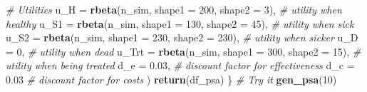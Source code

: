 \documentclass[
]{article}
\newenvironment{Shaded}{\begin{snugshade}}{\end{snugshade}}
\newcommand{\CommentTok}[1]{\textcolor[rgb]{0.56,0.35,0.01}{\textit{#1}}}
\newcommand{\DataTypeTok}[1]{\textcolor[rgb]{0.13,0.29,0.53}{#1}}
\newcommand{\DecValTok}[1]{\textcolor[rgb]{0.00,0.00,0.81}{#1}}
\newcommand{\FloatTok}[1]{\textcolor[rgb]{0.00,0.00,0.81}{#1}}
\newcommand{\KeywordTok}[1]{\textcolor[rgb]{0.13,0.29,0.53}{\textbf{#1}}}
\newcommand{\NormalTok}[1]{#1}
\begin{document}
\begin{Shaded}
\begin{Highlighting}[]
    \CommentTok{# Utilities}
    \DataTypeTok{u_H   =} \KeywordTok{rbeta}\NormalTok{(n_sim, }\DataTypeTok{shape1 =} \DecValTok{200}\NormalTok{, }\DataTypeTok{shape2 =} \DecValTok{3}\NormalTok{),     }\CommentTok{# utility when healthy}
    \DataTypeTok{u_S1  =} \KeywordTok{rbeta}\NormalTok{(n_sim, }\DataTypeTok{shape1 =} \DecValTok{130}\NormalTok{, }\DataTypeTok{shape2 =} \DecValTok{45}\NormalTok{),    }\CommentTok{# utility when sick}
    \DataTypeTok{u_S2  =} \KeywordTok{rbeta}\NormalTok{(n_sim, }\DataTypeTok{shape1 =} \DecValTok{230}\NormalTok{, }\DataTypeTok{shape2 =} \DecValTok{230}\NormalTok{),   }\CommentTok{# utility when sicker}
    \DataTypeTok{u_D   =} \DecValTok{0}\NormalTok{,                                          }\CommentTok{# utility when dead}
    \DataTypeTok{u_Trt =} \KeywordTok{rbeta}\NormalTok{(n_sim, }\DataTypeTok{shape1 =} \DecValTok{300}\NormalTok{, }\DataTypeTok{shape2 =} \DecValTok{15}\NormalTok{),    }\CommentTok{# utility when being treated}
    \DataTypeTok{d_e   =} \FloatTok{0.03}\NormalTok{,                                       }\CommentTok{# discount factor for effectiveness}
    \DataTypeTok{d_c   =} \FloatTok{0.03}                                        \CommentTok{# discount factor for costs}
\NormalTok{  )}
    \KeywordTok{return}\NormalTok{(df_psa)}
\NormalTok{\}}
\CommentTok{# Try it}
\KeywordTok{gen_psa}\NormalTok{(}\DecValTok{10}\NormalTok{) }
\end{Highlighting}
\end{Shaded}
\end{document}
